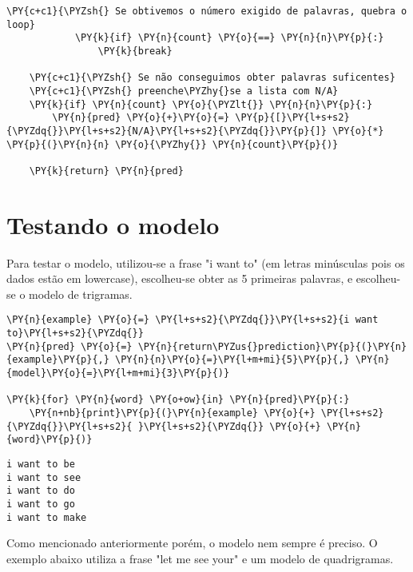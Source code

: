 \documentclass[a4paper,11pt,final]{article}
\begin{document}
\begin{Verbatim}[commandchars=\\\{\},frame=single,fontsize=\small, xleftmargin=0.5em]
            \PY{c+c1}{\PYZsh{} Se obtivemos o número exigido de palavras, quebra o loop}
            \PY{k}{if} \PY{n}{count} \PY{o}{==} \PY{n}{n}\PY{p}{:}
                \PY{k}{break}
                
    \PY{c+c1}{\PYZsh{} Se não conseguimos obter palavras suficentes}
    \PY{c+c1}{\PYZsh{} preenche\PYZhy{}se a lista com N/A}
    \PY{k}{if} \PY{n}{count} \PY{o}{\PYZlt{}} \PY{n}{n}\PY{p}{:}
        \PY{n}{pred} \PY{o}{+}\PY{o}{=} \PY{p}{[}\PY{l+s+s2}{\PYZdq{}}\PY{l+s+s2}{N/A}\PY{l+s+s2}{\PYZdq{}}\PY{p}{]} \PY{o}{*} \PY{p}{(}\PY{n}{n} \PY{o}{\PYZhy{}} \PY{n}{count}\PY{p}{)}
    
    \PY{k}{return} \PY{n}{pred}
\end{Verbatim}


\section{Testando o modelo}

Para testar o modelo, utilizou-se a frase "i want to" (em letras minúsculas pois os dados estão em lowercase), escolheu-se obter as 5 primeiras palavras, e escolheu-se o modelo de trigramas.



\begin{Verbatim}[commandchars=\\\{\},frame=single,fontsize=\small, xleftmargin=0.5em]
\PY{n}{example} \PY{o}{=} \PY{l+s+s2}{\PYZdq{}}\PY{l+s+s2}{i want to}\PY{l+s+s2}{\PYZdq{}}
\PY{n}{pred} \PY{o}{=} \PY{n}{return\PYZus{}prediction}\PY{p}{(}\PY{n}{example}\PY{p}{,} \PY{n}{n}\PY{o}{=}\PY{l+m+mi}{5}\PY{p}{,} \PY{n}{model}\PY{o}{=}\PY{l+m+mi}{3}\PY{p}{)}

\PY{k}{for} \PY{n}{word} \PY{o+ow}{in} \PY{n}{pred}\PY{p}{:}
    \PY{n+nb}{print}\PY{p}{(}\PY{n}{example} \PY{o}{+} \PY{l+s+s2}{\PYZdq{}}\PY{l+s+s2}{ }\PY{l+s+s2}{\PYZdq{}} \PY{o}{+} \PY{n}{word}\PY{p}{)}
\end{Verbatim}

\begin{Verbatim}[commandchars=\\\{\},frame=leftline,fontsize=\small, xleftmargin=0.5em]
i want to be
i want to see
i want to do
i want to go
i want to make
\end{Verbatim}


Como mencionado anteriormente porém, o modelo nem sempre é preciso. O exemplo abaixo utiliza a frase "let me see your" e um modelo de quadrigramas.
\end{document}

